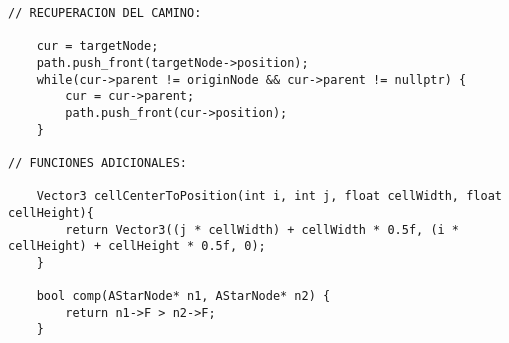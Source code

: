 \begin{lstlisting}
// RECUPERACION DEL CAMINO:

    cur = targetNode;
    path.push_front(targetNode->position);
    while(cur->parent != originNode && cur->parent != nullptr) {
        cur = cur->parent;
        path.push_front(cur->position);
    }

// FUNCIONES ADICIONALES:

    Vector3 cellCenterToPosition(int i, int j, float cellWidth, float cellHeight){ 
        return Vector3((j * cellWidth) + cellWidth * 0.5f, (i * cellHeight) + cellHeight * 0.5f, 0); 
    }

    bool comp(AStarNode* n1, AStarNode* n2) {
        return n1->F > n2->F;
    }


\end{lstlisting}